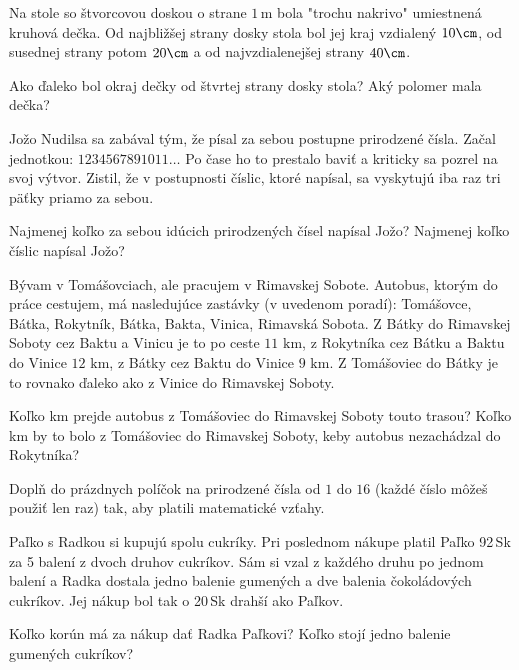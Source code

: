 ﻿{%
Na stole so štvorcovou doskou o strane $1\,\text{m}$ bola "trochu nakrivo" umiestnená kruhová dečka.
Od najbližšej strany dosky stola bol jej kraj vzdialený $10\cm$, od susednej strany potom $20\cm$
a od najvzdialenejšej strany $40\cm$.
\begin{itemize}
 Ako ďaleko bol okraj dečky od štvrtej strany dosky stola?
 Aký polomer mala dečka?
\end{itemize}
}

{%
Jožo Nudilsa sa zabával tým, že písal za sebou postupne prirodzené čísla. Začal jednotkou: $1234567891011\dots$ Po čase ho to prestalo baviť a kriticky sa pozrel na svoj výtvor. Zistil, že v postupnosti číslic, ktoré napísal, sa vyskytujú iba raz tri päťky priamo za sebou.
\begin{itemize}
 Najmenej koľko za sebou idúcich prirodzených čísel napísal Jožo?
 Najmenej koľko číslic napísal Jožo?
\end{itemize}
}

{%
Bývam v Tomášovciach, ale pracujem v Rimavskej Sobote. Autobus, ktorým do práce cestujem, má nasledujúce zastávky (v uvedenom poradí): Tomášovce, Bátka, Rokytník, Bátka, Bakta, Vinica, Rimavská Sobota. Z Bátky do Rimavskej Soboty cez Baktu a Vinicu je to po ceste $11\text{ km}$, z Rokytníka cez Bátku a Baktu do Vinice $12\text{ km}$, z Bátky cez Baktu do Vinice $9\text{ km}$. Z Tomášoviec do Bátky je to rovnako ďaleko ako z Vinice do Rimavskej Soboty.
\begin{itemize}
 Koľko km prejde autobus z Tomášoviec do Rimavskej Soboty touto trasou?
 Koľko km by to bolo z Tomášoviec do Rimavskej Soboty, keby autobus nezachádzal do Rokytníka?
\end{itemize}
}

{%
Doplň do prázdnych políčok na \obr{} prirodzené čísla od $1$ do $16$ (každé číslo môžeš použiť len raz)
tak, aby platili matematické vzťahy.
%
}

{%
Paľko s Radkou si kupujú spolu cukríky. Pri poslednom nákupe platil Paľko 92\,Sk za 5 balení z dvoch druhov cukríkov. Sám si vzal z každého druhu po jednom balení a Radka dostala jedno balenie gumených a dve balenia čokoládových cukríkov. Jej nákup bol tak o 20\,Sk drahší ako Paľkov.
\begin{itemize}
 Koľko korún má za nákup dať Radka Paľkovi?
 Koľko stojí jedno balenie gumených cukríkov?
\end{itemize}
}

